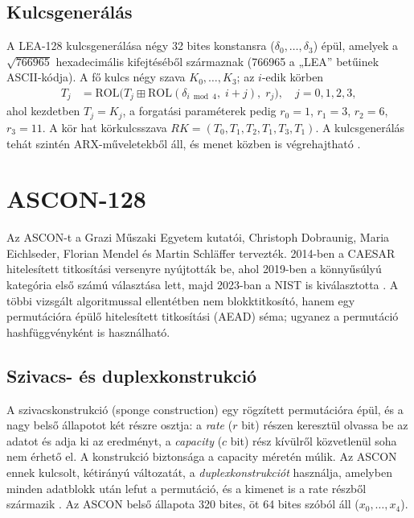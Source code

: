 \documentclass[a4paper,12pt]{report}
\theoremstyle{definition}
\theoremstyle{remark}
\begin{document}
\subsection{Kulcsgenerálás}\label{sec:lea_kulcs}

A LEA-128 kulcsgenerálása négy 32 bites konstansra ($\delta_0, \ldots, \delta_3$) épül, amelyek a $\sqrt{766965}$ hexadecimális kifejtéséből származnak (766965 a „LEA'' betűinek ASCII-kódja). A fő kulcs négy szava $K_0, \ldots, K_3$; az $i$-edik körben
\begin{align}
T_j &= \text{ROL}\big(T_j \mathbin{\boxplus} \text{ROL}(\delta_{i \bmod 4},\; i+j),\; r_j\big), \quad j = 0,1,2,3,
\end{align}
ahol kezdetben $T_j = K_j$, a forgatási paraméterek pedig $r_0 = 1$, $r_1 = 3$, $r_2 = 6$, $r_3 = 11$. A kör hat körkulcsszava $RK = (T_0, T_1, T_2, T_1, T_3, T_1)$. A kulcsgenerálás tehát szintén ARX-műveletekből áll, és menet közben is végrehajtható \cite{Hong2013}.

\section{ASCON-128}\label{sec:ascon}

Az ASCON-t a Grazi Műszaki Egyetem kutatói, Christoph Dobraunig, Maria Eichlseder, Florian Mendel és Martin Schläffer tervezték. 2014-ben a CAESAR hitelesített titkosítási versenyre nyújtották be, ahol 2019-ben a könnyűsúlyú kategória első számú választása lett, majd 2023-ban a NIST is kiválasztotta \cite{Dobraunig2021,NISTLWC2023}. A többi vizsgált algoritmussal ellentétben nem blokktitkosító, hanem egy permutációra épülő hitelesített titkosítási (AEAD) séma; ugyanez a permutáció hashfüggvényként is használható.

\subsection{Szivacs- és duplexkonstrukció}\label{sec:ascon_szivacs}

A szivacskonstrukció (sponge construction) egy rögzített permutációra épül, és a nagy belső állapotot két részre osztja: a \emph{rate} ($r$ bit) részen keresztül olvassa be az adatot és adja ki az eredményt, a \emph{capacity} ($c$ bit) rész kívülről közvetlenül soha nem érhető el. A konstrukció biztonsága a capacity méretén múlik. Az ASCON ennek kulcsolt, kétirányú változatát, a \emph{duplexkonstrukciót} használja, amelyben minden adatblokk után lefut a permutáció, és a kimenet is a rate részből származik \cite{Dobraunig2021}. Az ASCON belső állapota 320 bites, öt 64 bites szóból áll ($x_0, \ldots, x_4$).
\end{document}
